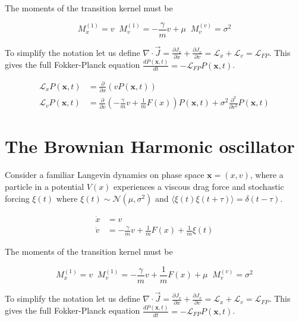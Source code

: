The moments of the transition kernel must be

\begin{equation*}
M_{x}^{(1)} = v  \;\; M_{v}^{(1)} = -\frac{\gamma}{m}v + \mu \;\; M_{v}^{(v)} = \sigma^{2}
\end{equation*}

To simplify the notation let us define $\nabla\cdot \vec{J} = \frac{\partial J_{x}}{\partial x} + \frac{\partial J_{x}}{\partial v}= \mathcal{L}_{x} + \mathcal{L}_{v} = \mathcal{L}_{FP}$. This gives the full Fokker-Planck equation $\frac{dP(\bm{x},t)}{dt} = -\mathcal{L}_{FP}P(\bm{x},t)$. 

\begin{align*}
\mathcal{L}_{x}P(\bm{x},t) &= \frac{\partial}{\partial x}\left(vP(\bm{x},t)\right)\\
\mathcal{L}_{v}P(\bm{x},t) &= \frac{\partial}{\partial v}\left(-\frac{\gamma}{m}v + \frac{1}{m}F(x)\right)P(\bm{x},t) + \sigma^{2}\frac{\partial^{2}}{\partial v^{2}}P(\bm{x},t)
\end{align*}


\section{The Brownian Harmonic oscillator}

Consider a familiar Langevin dynamics on phase space $\bm{x} = (x,v)$, where a particle in a potential $V(x)$ experiences a viscous drag force and stochastic forcing $\xi(t)$ where $\xi(t)\sim\mathcal{N}(\mu,\sigma^{2})$ and $\langle \xi(t)\xi(t+\tau)\rangle = \delta(t-\tau)$. 

\begin{align*}
\dot{x} &= v\\
\dot{v} &= -\frac{\gamma}{m}v + \frac{1}{m}F(x) + \frac{1}{m}\xi(t)
\end{align*}

The moments of the transition kernel must be

\begin{equation*}
M_{x}^{(1)} = v  \;\; M_{v}^{(1)} = -\frac{\gamma}{m}v + \frac{1}{m}F(x) + \mu \;\; M_{v}^{(v)} = \sigma^{2}
\end{equation*}

To simplify the notation let us define $\nabla\cdot \vec{J} = \frac{\partial J_{x}}{\partial x} + \frac{\partial J_{x}}{\partial v}= \mathcal{L}_{x} + \mathcal{L}_{v} = \mathcal{L}_{FP}$. This gives the full Fokker-Planck equation $\frac{dP(\bm{x},t)}{dt} = -\mathcal{L}_{FP}P(\bm{x},t)$. 


